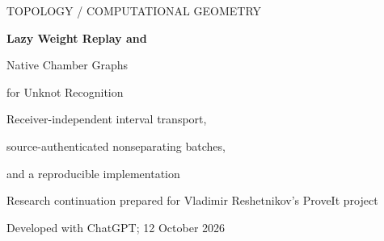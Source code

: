\documentclass[11pt]{article}
\theoremstyle{definition}
\begin{document}
\hypersetup{pageanchor=false}
\begin{titlepage}
\vspace*{0.28in}
{\large\sffamily\color{accent} TOPOLOGY / COMPUTATIONAL GEOMETRY\par}
\vspace{0.25in}
{\LARGE\bfseries Lazy Weight Replay and\par Native Chamber Graphs\par}
\vspace{0.16in}
{\Large for Unknot Recognition\par}
\vspace{0.25in}
{\large Receiver-independent interval transport,\par
source-authenticated nonseparating batches,\par
and a reproducible implementation\par}
\vspace{0.28in}
{Research continuation prepared for Vladimir Reshetnikov's ProveIt project\par}
{Developed with ChatGPT; 12 October 2026\par}
\vspace{0.2in}
\begin{abstract}
Two concrete operations remain costly or incomplete in the current compressed
geometry program. The weighted certificate checker repeatedly reconstructs
constant-run partitions, including receiver intervals on which the same
vector is added uniformly. The earlier chamber-graph framework, meanwhile,
accepts geometric component labels and side locations that its native caller
does not yet supply.

We replace the checker's flat weight state by a deterministic balanced
sequence with implicit integer lengths and lazy vector additions. A
translation or reflection fold with \(S\) deleted suffix runs uses
\(O((S+1)\log(R+2))\) tree work, together with residue sorting for translations,
independently of the number of receiver runs. A complete family of legal
Agol--Hass--Thurston traces separates the previous \(\Omega(HL)\) repeated
receiver work from the new \(O(L+H\log(L+2))\) weight transport. We retain the
independent residue-derivative arithmetic and the original certificate schema.

We also implement a native chamber-graph exporter for a supplied normal
surface with explicit component representatives. Exact scalar orbit censuses
authenticate the component labels and locate both sides in the cut
complement; the normal double checks two-sidedness. An independent checker
reconstructs the side markers from raw cut-cell charts. The resulting graph
supports the earlier exact cographic criterion for simultaneous
nonseparation on actual source inputs.


\end{abstract}
\end{titlepage}
\end{document}
